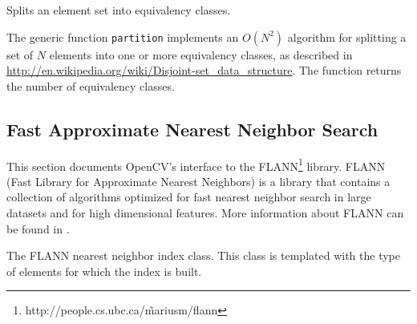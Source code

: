 Splits an element set into equivalency classes.

\begin{description}
\end{description}

The generic function \texttt{partition} implements an $O(N^2)$ algorithm for
splitting a set of $N$ elements into one or more equivalency classes, as described in \url{http://en.wikipedia.org/wiki/Disjoint-set_data_structure}. The function
returns the number of equivalency classes.

\subsection{Fast Approximate Nearest Neighbor Search}

This section documents OpenCV's interface to the FLANN\footnote{http://people.cs.ubc.ca/\~mariusm/flann} library. FLANN (Fast Library for Approximate Nearest Neighbors) is a library that
contains a collection of algorithms optimized for fast nearest neighbor search in large datasets and for high dimensional features. More 
information about FLANN can be found in \cite{muja_flann_2009}.

The FLANN nearest neighbor index class. This class is templated with the type of elements for which the index is built.

